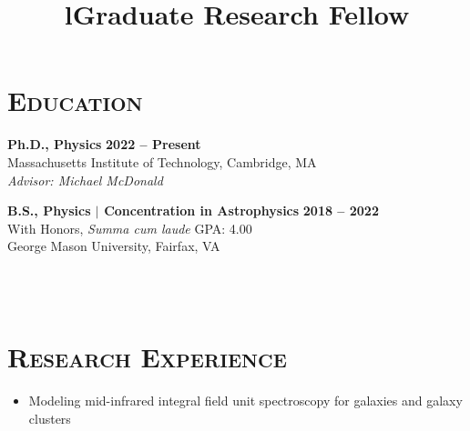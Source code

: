 \documentclass[marg, centered]{res}
\newcommand{\CVItem}[1]{
  \item\small{
    {#1 \vspace{-2pt}}
  }
}
\begin{document}
\begin{resume}

\section{{\scshape \bfseries Education}}
\textbf{Ph.D., Physics} \hfill {\bf 2022 -- Present} \\
Massachusetts Institute of Technology, Cambridge, MA \\
{\em Advisor: Michael McDonald} \\
\vspace{-0.7cm}

\textbf{B.S., Physics $\mathbf{|}$ Concentration in Astrophysics} \hfill {\bf 2018 -- 2022}\\
With Honors, \textit{Summa cum laude} \hfill GPA: 4.00 \\
George Mason University, Fairfax, VA

\begin{format}
\title{l}\\
\\
\body
\end{format}

\section{{\scshape \bfseries Research Experience}}
\title{\textbf{Graduate Research Fellow}}
\begin{position}
\vspace{-0.35cm}
\begin{itemize}
    \CVItem{Modeling mid-infrared integral field unit spectroscopy for galaxies and galaxy clusters}
\end{itemize}
\end{position}


\end{resume}
\end{document}
